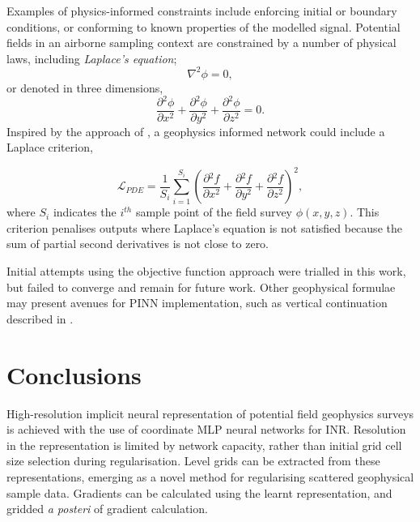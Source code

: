 \documentclass[manuscript.tex]{subfiles}
\begin{document}
Examples of physics-informed constraints include enforcing initial or boundary conditions, or conforming to known properties of the modelled signal.
Potential fields in an airborne sampling context are constrained by a number of physical laws, including \emph{Laplace's equation};
\[
    \nabla^2 \phi = 0,
\]
or denoted in three dimensions,
\begin{equation}
    \label{eqn:Laplace}
    \frac{\partial{}^2\phi}{\partial{}x^2} + \frac{\partial{}^2\phi}{\partial{}y^2} + \frac{\partial{}^2\phi}{\partial{}z^2} = 0.
\end{equation}
Inspired by the approach of \cite{raissiPhysicsinformedNeuralNetworks2019}, a geophysics informed network could include a Laplace criterion,

\begin{equation}
    \label{eqn:cri_laplace}
    \mathcal{L}_{PDE} = \frac{1}{S_i}\sum_{i=1}^{S_i} \left(\frac{\partial{}^2f}{\partial{}x^2} + \frac{\partial{}^2f}{\partial{}y^2} + \frac{\partial{}^2f}{\partial{}z^2}\right)^2,
\end{equation}
where \(S_i\) indicates the \(i^{th}\) sample point of the field survey \(\phi(x, y, z)\).
This criterion penalises outputs where Laplace's equation is not satisfied because the sum of partial second derivatives is not close to zero.


Initial attempts using the objective function approach were trialled in this work, but failed to converge and remain for future work.
Other geophysical formulae may present avenues for PINN implementation, such as vertical continuation described in \cite{blakelyPotentialTheoryGravity1996}.

\section{Conclusions}
High-resolution implicit neural representation of potential field geophysics surveys is achieved with the use of coordinate MLP neural networks for INR.
Resolution in the representation is limited by network capacity, rather than initial grid cell size selection during regularisation.
Level grids can be extracted from these representations, emerging as a novel method for regularising scattered geophysical sample data.
Gradients can be calculated using the learnt representation, and gridded \emph{a posteri} of gradient calculation.
\end{document}
